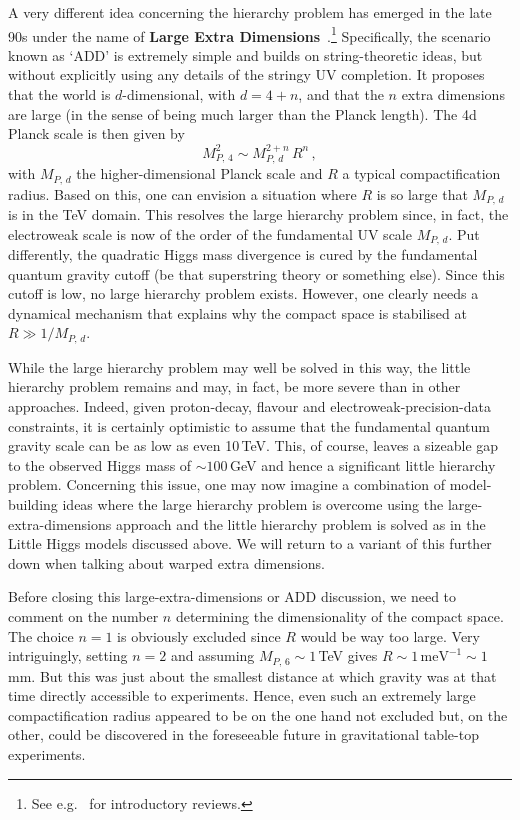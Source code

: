 \documentclass[12pt]{article}
\newcommand{\be}{\begin{equation}}
\newcommand{\ee}{\end{equation}}
\numberwithin{equation}{section}
\begin{document}
A very different idea concerning the hierarchy problem has emerged in the late 90s under the name of {\bf Large Extra Dimensions}~\cite{ArkaniHamed:1998rs, Antoniadis:1998ig}.\footnote{
See e.g.~\cite{Rubakov:2001kp, Csaki:2004ay} for introductory reviews.
} 
Specifically, the scenario known as `ADD' is extremely simple and builds on string-theoretic ideas, but without explicitly using any details of the stringy UV completion. It proposes that the world is $d$-dimensional, with $d=4+n$, and that the $n$ extra dimensions are large (in the sense of being much larger than the Planck length). The 4d Planck scale is then given by
\be
M_{P,\, 4}^2 \sim M_{P,\, d}^{2+n}\,R^n\,,
\ee
with $M_{P,\, d}$ the higher-dimensional Planck scale and $R$ a typical compactification radius. Based on this, one can envision a situation where $R$ is so large that $M_{P,\, d}$ is in the TeV domain. This resolves the large hierarchy problem since, in fact, the electroweak scale is now of the order of the fundamental UV scale $M_{P,\,d}$. Put differently, the quadratic Higgs mass divergence is cured by the fundamental quantum gravity cutoff (be that superstring theory or something else). Since this cutoff is low, no large hierarchy problem exists. However, one clearly needs a dynamical mechanism that explains why the compact space is stabilised at $R\gg 1/M_{P,\,d}$.

While the large hierarchy problem may well be solved in this way, the little hierarchy problem remains and may, in fact, be more severe than in other approaches. Indeed, given proton-decay, flavour and electroweak-precision-data constraints, it is certainly optimistic to assume that the fundamental quantum gravity scale can be as low as even 10$\,$TeV. This, of course, leaves a sizeable gap to the observed Higgs mass of $\sim 100\,$GeV and hence a significant little hierarchy problem. Concerning this issue, one may now imagine a combination of model-building ideas where the large hierarchy problem is overcome using the large-extra-dimensions approach and the little hierarchy problem is solved as in the Little Higgs models discussed above. We will return to a variant of this further down when talking about warped extra dimensions.

Before closing this large-extra-dimensions or ADD discussion, we need to comment on the number $n$ determining the dimensionality of the compact space. The choice $n=1$ is obviously excluded since $R$ would be way too large. Very intriguingly, setting $n=2$ and assuming $M_{P,\,6}\sim 1\,$TeV gives $R\sim1\, \mbox{meV}^{-1}\sim 1\,$mm. But this was just about the smallest distance at which gravity was at that time directly accessible to experiments. Hence, even such an extremely large compactification radius appeared to be on the one hand not excluded but, on the other, could be discovered in the foreseeable future in gravitational table-top experiments.
\end{document}
